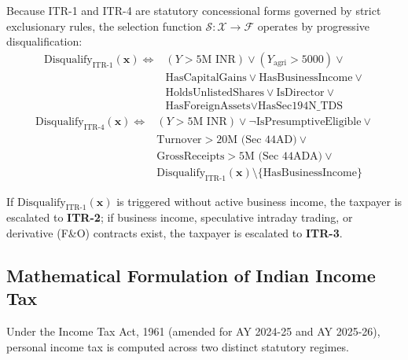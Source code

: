 \documentclass[conference]{IEEEtran}
\begin{document}
Because ITR-1 and ITR-4 are statutory concessional forms governed by strict exclusionary rules, the selection function $\mathcal{S}: \mathcal{X} \to \mathcal{F}$ operates by progressive disqualification:
\begin{align}
\text{Disqualify}_{\text{ITR-1}}(\mathbf{x}) \iff & (Y > 5\text{M INR}) \lor (Y_{\text{agri}} > 5000) \lor \nonumber \\
& \text{HasCapitalGains} \lor \text{HasBusinessIncome} \lor \nonumber \\
& \text{HoldsUnlistedShares} \lor \text{IsDirector} \lor \nonumber \\
& \text{HasForeignAssets} \lor \text{HasSec194N\_TDS}
\end{align}
\begin{align}
\text{Disqualify}_{\text{ITR-4}}(\mathbf{x}) \iff & (Y > 5\text{M INR}) \lor \neg \text{IsPresumptiveEligible} \lor \nonumber \\
& \text{Turnover} > 20\text{M (Sec 44AD)} \lor \nonumber \\
& \text{GrossReceipts} > 5\text{M (Sec 44ADA)} \lor \nonumber \\
& \text{Disqualify}_{\text{ITR-1}}(\mathbf{x}) \setminus \{\text{HasBusinessIncome}\}
\end{align}

If $\text{Disqualify}_{\text{ITR-1}}(\mathbf{x})$ is triggered without active business income, the taxpayer is escalated to \textbf{ITR-2}; if business income, speculative intraday trading, or derivative (F\&O) contracts exist, the taxpayer is escalated to \textbf{ITR-3}.

\subsection{Mathematical Formulation of Indian Income Tax}
Under the Income Tax Act, 1961 (amended for AY 2024-25 and AY 2025-26), personal income tax is computed across two distinct statutory regimes.
\end{document}
